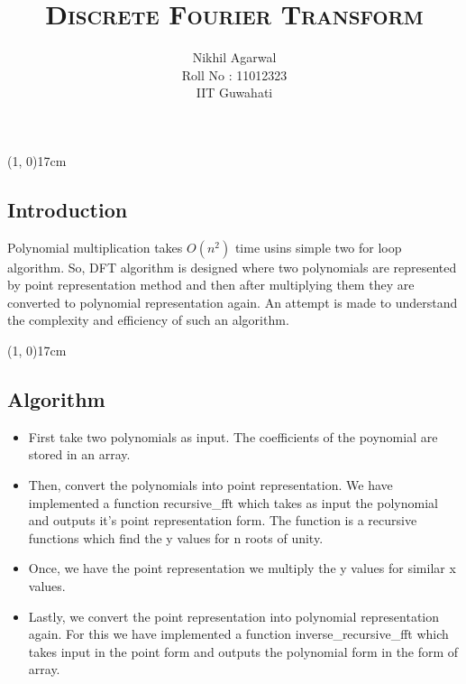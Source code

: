\documentclass[10pt]{article}
\begin{document}
\title{\textbf{\textsc{Discrete Fourier Transform}}}
\author{Nikhil Agarwal \\
		Roll No : 11012323 \\
		IIT Guwahati}
\date{}
\maketitle

\begin{center}
	\line(1, 0){17cm}
\end{center}
\begin{center}
 \section*{Introduction}
 \end{center}
 
 Polynomial multiplication takes $O(n^2)$ time usins simple two for loop algorithm. So, DFT algorithm is designed where two polynomials are represented by point representation method and then after multiplying them they are converted to polynomial representation again. An attempt is made to understand the complexity and efficiency of such an algorithm.

\begin{center}
	\line(1, 0){17cm}
\end{center}

\begin{center}
  \section*{Algorithm}
\end{center}

 
\begin{itemize}
\item First take two polynomials as input. The coefficients of the poynomial are stored in an array.\\

\item Then, convert the polynomials into point representation. We have implemented a function recursive\_fft which takes as input the polynomial and outputs it's point representation form. The function is a recursive functions which find the y values for n roots   of unity.\\

\item Once, we have the point representation we multiply the y values for similar x values. \\

\item Lastly, we convert the point representation into polynomial representation again. For this we have implemented a function
   inverse\_recursive\_fft which takes input in the point form and outputs the polynomial form in the form of array.\\
   
\end{itemize}
\end{document}
